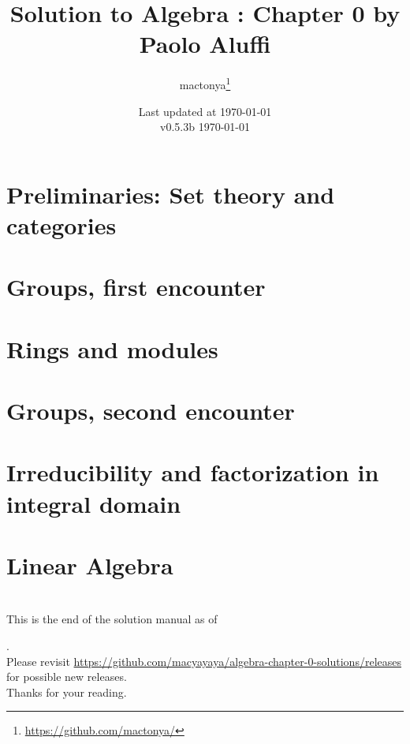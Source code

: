 \documentclass[12pt,a4paper,dvipsnames,oneside]{book}
\title{Solution to Algebra : Chapter 0 by Paolo Aluffi}
\author{mactonya\thanks{\href{https://github.com/mactonya/}{https://github.com/mactonya/}}}
\date{Last updated at \today \\
v0.5.3b
}
\theoremstyle{definition}
\theoremstyle{definition}
\begin{document}
\frontmatter
\maketitle

\tableofcontents
\mainmatter
\chapter{Preliminaries: Set theory and categories}

\newpage
\chapter{Groups, first encounter}

\newpage  
\chapter{Rings and modules}

\newpage
\chapter{Groups, second encounter}

\newpage
\chapter{Irreducibility and factorization in integral domain}

\newpage
\chapter{Linear Algebra}

\newpage

\backmatter
\chapter{}
\thispagestyle{empty}
\begin{center}
\large{
This is the end of the solution manual as of \date{\today}. \\
Please revisit \href{https://github.com/macyayaya/algebra-chapter-0-solutions/releases}{https://github.com/macyayaya/algebra-chapter-0-solutions/releases} \\
for possible new releases. \\
Thanks for your reading.
}
\end{center}
\end{document}
